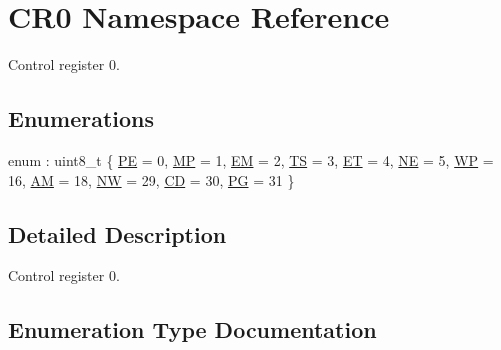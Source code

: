\hypertarget{namespace_c_r0}{}\section{C\+R0 Namespace Reference}
\label{namespace_c_r0}


Control register 0.  


\subsection*{Enumerations}
\begin{DoxyCompactItemize}
\item 
enum \+: uint8\+\_\+t \{ \newline
\hyperlink{namespace_c_r0_aca53d8161d60c86788386fa6db06e7aaa7f3a9f7cae8ff9783116b3807a9e7f63}{PE} = 0, 
\hyperlink{namespace_c_r0_aca53d8161d60c86788386fa6db06e7aaa5d476977d06d7c0b03c9c15c07a79a67}{MP} = 1, 
\hyperlink{namespace_c_r0_aca53d8161d60c86788386fa6db06e7aaa7b84c2b5b161093766d5ce338ae954fd}{EM} = 2, 
\hyperlink{namespace_c_r0_aca53d8161d60c86788386fa6db06e7aaa11d3ddf6dc3d1d972c1df841c8612a98}{TS} = 3, 
\newline
\hyperlink{namespace_c_r0_aca53d8161d60c86788386fa6db06e7aaaea1442f406aa6dac094cac2466be6da7}{ET} = 4, 
\hyperlink{namespace_c_r0_aca53d8161d60c86788386fa6db06e7aaaec96b199175e3576b8864dc1ac07ac4e}{NE} = 5, 
\hyperlink{namespace_c_r0_aca53d8161d60c86788386fa6db06e7aaa26b870d7f1a47ad83f6c2ce739189171}{WP} = 16, 
\hyperlink{namespace_c_r0_aca53d8161d60c86788386fa6db06e7aaa2325d7d071248d4efffdf7bd809decb7}{AM} = 18, 
\newline
\hyperlink{namespace_c_r0_aca53d8161d60c86788386fa6db06e7aaa09776e60fc989f19ae0f04a402d2d1bb}{NW} = 29, 
\hyperlink{namespace_c_r0_aca53d8161d60c86788386fa6db06e7aaa4154f3b5cb906ec0bfab20c87e8a7d84}{CD} = 30, 
\hyperlink{namespace_c_r0_aca53d8161d60c86788386fa6db06e7aaa674029f08e40b913896b27f5cb5e1ec8}{PG} = 31
 \}
\end{DoxyCompactItemize}


\subsection{Detailed Description}
Control register 0. 

\subsection{Enumeration Type Documentation}
\mbox{\label{namespace_c_r0_aca53d8161d60c86788386fa6db06e7aa}} 
